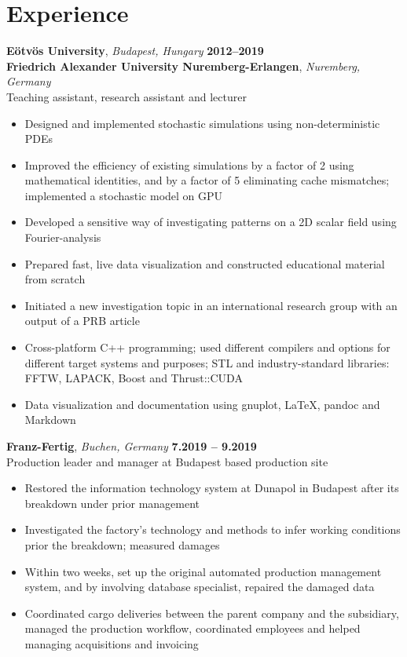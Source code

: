 \documentclass[10pt,USletter,sans]{moderncv}        %
\begin{document}
\section{Experience}
\textbf{Eötvös University}, \emph{Budapest, Hungary}  \hfill \textbf{2012--2019}\\
\textbf{Friedrich Alexander University Nuremberg-Erlangen}, \emph{Nuremberg, Germany}\\
Teaching assistant, research assistant and lecturer
\begin{itemize}
\item Designed and implemented stochastic simulations using non-deterministic PDEs
\item Improved the efficiency of existing simulations by a factor of 2 using mathematical identities, and by a factor of 5 eliminating cache mismatches; implemented a stochastic model on GPU
\item Developed a sensitive way of investigating patterns on a 2D scalar field using Fourier-analysis
\item Prepared fast, live data visualization and constructed educational material from scratch
\item Initiated a new investigation topic in an international research group with an output of a PRB article
\item Cross-platform C++ programming; used different compilers and options for different target systems and purposes; STL and industry-standard libraries: FFTW, LAPACK, Boost and Thrust::CUDA
\item Data visualization and documentation using gnuplot, LaTeX, pandoc and Markdown
\end{itemize}
\vspace{6pt}

\textbf{Franz-Fertig}, \emph{Buchen, Germany}  \hfill \textbf{7.2019 -- 9.2019}\\
Production leader and manager at Budapest based production site

\begin{itemize}
\item Restored the information technology system at Dunapol in Budapest after its breakdown under prior management
\item Investigated the factory's technology and methods to infer working conditions prior the breakdown; measured damages
\item Within two weeks, set up the original automated production management system, and by involving database specialist, repaired the damaged data
\item Coordinated cargo deliveries between the parent company and the subsidiary, managed the production workflow, coordinated employees and helped managing acquisitions and invoicing
\end{itemize}
\vspace{3pt}
\end{document}
